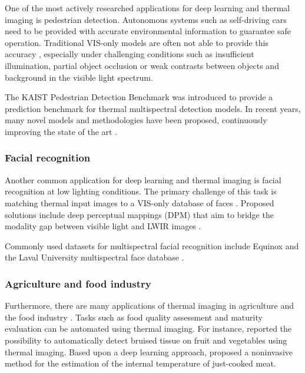 \documentclass{l4proj}
\begin{document}
One of the most actively researched applications for deep learning and thermal imaging is pedestrian detection. Autonomous systems such as self-driving cars need to be provided with accurate environmental information to guarantee safe operation. Traditional VIS-only models are often not able to provide this accuracy \citep{zhang_how_2016}, especially under challenging conditions such as insufficient illumination, partial object occlusion or weak contrasts between objects and background in the visible light spectrum. 

The KAIST Pedestrian Detection Benchmark \citep{hwang_multispectral_2015} was introduced to provide a prediction benchmark for thermal multispectral detection models. In recent years, many novel models and methodologies have been proposed, continuously improving the state of the art \citep{wagner_multispectral_2016, konig_fully_2017, guan_fusion_2019}.

\subsubsection{Facial recognition}

Another common application for deep learning and thermal imaging is facial recognition at low lighting conditions. The primary challenge of this task is matching thermal input images to a VIS-only database of faces \citep{choi_thermal_2012}. Proposed solutions include deep perceptual mappings (DPM) that aim to bridge the modality gap between visible light and LWIR images \citep{sarfraz_deep_2017}. 

Commonly used datasets for multispectral facial recognition include Equinox \citep{selinger_appearance-based_2006} and the Laval University multispectral face database \citep{akhloufi_multispectral_2009}.

\subsubsection{Agriculture and food industry}

Furthermore, there are many applications of thermal imaging in agriculture and the food industry \citep{vadivambal_applications_2011}. Tasks such as food quality assessment and maturity evaluation can be automated using thermal imaging. For instance, \citet{gowen_applications_2010} reported the possibility to automatically detect bruised tissue on fruit and vegetables using thermal imaging. Based upon a deep learning approach, \citet{ibarra_combined_2000} proposed a noninvasive method for the estimation of the internal temperature of just-cooked meat. 
\end{document}
